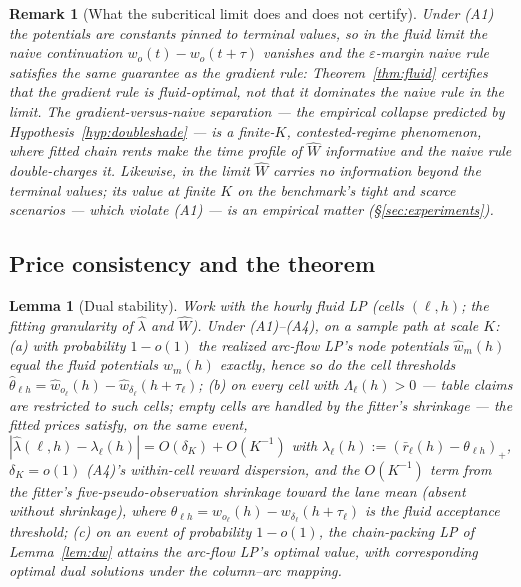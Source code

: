 \documentclass[11pt]{article}
\newtheorem{lemma}{Lemma}
\newtheorem{remark}{Remark}
\begin{document}
\begin{remark}[What the subcritical limit does and does not certify]
\label{rem:honest}
Under (A1) the potentials are constants pinned to terminal values, so
in the fluid \emph{limit} the naive continuation $w_o(t) - w_o(t+\tau)$
vanishes and the $\varepsilon$-margin naive rule satisfies the same
guarantee as the gradient rule: Theorem~\ref{thm:fluid} certifies that
the gradient rule is fluid-optimal, not that it dominates the naive
rule in the limit. The gradient-versus-naive separation --- the
empirical collapse predicted by Hypothesis~\ref{hyp:doubleshade} ---
is a finite-$K$, contested-regime phenomenon, where fitted chain rents
make the time profile of $\widehat{W}$ informative and the naive rule
double-charges it. Likewise, in the limit $\widehat{W}$ carries no
information beyond the terminal values; its value at finite $K$ on the
benchmark's tight and scarce scenarios --- which violate (A1) --- is an
empirical matter (\S\ref{sec:experiments}).
\end{remark}

\subsection{Price consistency and the theorem}

\begin{lemma}[Dual stability]
\label{lem:stability}
Work with the hourly fluid LP (cells $(\ell, h)$; the fitting
granularity of $\hat{\lambda}$ and $\widehat{W}$). Under (A1)--(A4), on
a sample path at scale $K$: (a) with probability $1 - o(1)$ the
realized arc-flow LP's node potentials $\hat{w}_m(h)$ equal the
fluid potentials $w_m(h)$ exactly, hence so do the cell thresholds
$\hat{\theta}_{\ell h} = \hat{w}_{o_{\ell}}(h) -
\hat{w}_{\delta_{\ell}}(h + \tau_{\ell})$; (b) on every cell with
$\Lambda_{\ell}(h) > 0$ --- table claims are restricted to such
cells; empty cells are handled by the fitter's shrinkage --- the
fitted prices satisfy, on the same event,
$|\hat{\lambda}(\ell, h) - \lambda_{\ell}(h)| =
O(\delta_K) + O(K^{-1})$
with $\lambda_{\ell}(h)
:= (\bar{r}_{\ell}(h) - \theta_{\ell h})_+$, $\delta_K = o(1)$
(A4)'s within-cell reward dispersion, and the $O(K^{-1})$ term from
the fitter's five-pseudo-observation shrinkage toward the lane mean
(absent without shrinkage), where
$\theta_{\ell h} = w_{o_{\ell}}(h) - w_{\delta_{\ell}}(h + \tau_{\ell})$
is the fluid acceptance threshold; (c) on an event of
probability $1 - o(1)$, the chain-packing LP of Lemma~\ref{lem:dw}
attains the arc-flow LP's optimal value, with corresponding optimal
dual solutions under the column--arc mapping.
\end{lemma}
\end{document}
